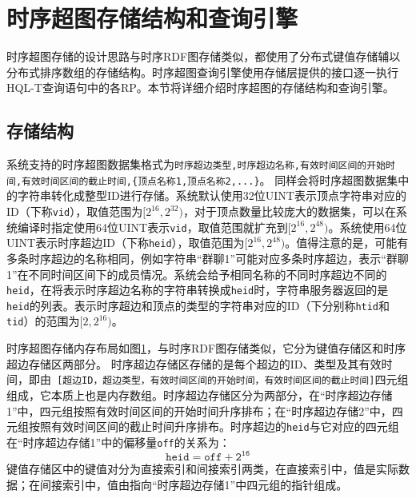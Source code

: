 \section{时序超图存储结构和查询引擎}
时序超图存储的设计思路与时序RDF图存储类似，都使用了分布式键值存储辅以分布式排序数组的存储结构。时序超图查询引擎使用存储层提供的接口逐一执行HQL-T查询语句中的各RP。本节将详细介绍时序超图的存储结构和查询引擎。
\subsection{存储结构}
\label{sec:hyperstore}
系统支持的时序超图数据集格式为\texttt{时序超边类型,时序超边名称,有效时间区间的开始时间,有效时间区间的截止时间,\{顶点名称1,顶点名称2,...\}}。
\sys 同样会将时序超图数据集中的字符串转化成整型ID进行存储。系统默认使用32位UINT表示顶点字符串对应的ID（下称\texttt{vid}），取值范围为$[2^{16}, 2^{32})$，对于顶点数量比较庞大的数据集，可以在系统编译时指定使用64位UINT表示\texttt{vid}，取值范围就扩充到$[2^{16}, 2^{48})$。系统使用64位UINT表示时序超边ID（下称\texttt{heid}），取值范围为$[2^{16}, 2^{48})$。值得注意的是，可能有多条时序超边的名称相同，例如字符串“群聊1”可能对应多条时序超边，表示“群聊1”在不同时间区间下的成员情况。系统会给予相同名称的不同时序超边不同的\texttt{heid}，在将表示时序超边名称的字符串转换成\texttt{heid}时，字符串服务器返回的是\texttt{heid}的列表。表示时序超边和顶点的类型的字符串对应的ID（下分别称\texttt{htid}和\texttt{tid}）的范围为$[2,2^{16})$。

时序超图存储内存布局如图\ref{thyperstore}，与时序RDF图存储类似，它分为键值存储区和时序超边存储区两部分。
时序超边存储区存储的是每个超边的ID、类型及其有效时间，即由\texttt{
[超边ID，超边类型，有效时间区间的开始时间，有效时间区间的截止时间]}四元组组成，它本质上也是内存数组。时序超边存储区分为两部分，在“时序超边存储1”中，四元组按照有效时间区间的开始时间升序排布；在“时序超边存储2”中，四元组按照有效时间区间的截止时间升序排布。时序超边的\texttt{heid}与它对应的四元组在“时序超边存储1”中的偏移量\texttt{off}的关系为：
\begin{equation}
    \mathtt{heid = off + 2^{16}}
\end{equation}
键值存储区中的键值对分为直接索引和间接索引两类，在直接索引中，值是实际数据；在间接索引中，值由指向“时序超边存储1”中四元组的指针组成。

\begin{figure}[!htb]
\label{thyperstore}
\end{figure}

